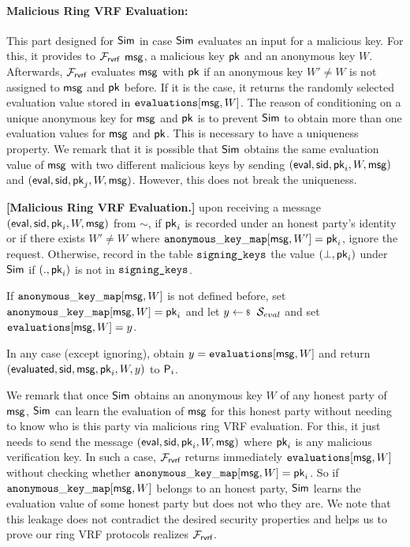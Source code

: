 \paragraph{Malicious Ring VRF Evaluation:} This part  designed for $ \mathsf{Sim} $ in case $ \mathsf{Sim} $  evaluates an input for a malicious key. For this,  it  provides to $ \mathcal{F}_{\textsf{rvrf}} $  $ \mathsf{msg} $, a malicious key $ \mathsf{pk} $ and an anonymous key $ W $.  Afterwards, $ \mathcal{F}_{\textsf{rvrf}} $ evaluates  $ \mathsf{msg} $ with $ \mathsf{pk} $ if an anonymous key $ W' \neq W$  is not assigned to $ \mathsf{msg} $ and $ \mathsf{pk} $ before.  If it is the case, it returns the randomly selected evaluation value stored  in $ \texttt{evaluations}[\mathsf{msg}, W] $. The reason of conditioning on a unique anonymous key for $ \mathsf{msg} $ and $ \mathsf{pk} $ is to prevent $ \mathsf{Sim} $ to obtain more than one evaluation values for $ \mathsf{msg} $ and $ \mathsf{pk} $. This is necessary to have a uniqueness property.
We remark that it is possible  that $ \mathsf{Sim} $ obtains the same evaluation value of $ \mathsf{msg} $ with two different malicious  keys  by sending $ (\mathsf{eval}, \textsf{sid}, \mathsf{pk}_i, W, \mathsf{msg}) $ and $(\mathsf{eval}, \textsf{sid}, \mathsf{pk}_j, W, \mathsf{msg})$. However, this does not break the uniqueness.

\begin{tcolorbox}[left=2pt,right=2pt]
	\eprint{}{\scriptsize}
	\textbf{[Malicious Ring VRF Evaluation.]}  upon receiving a message $(\mathsf{eval}, \textsf{sid}, \mathsf{pk}_i, W, \mathsf{msg})$ from $\sim$, if $ \mathsf{pk}_i $ is recorded under an honest party's identity or if there exists $ W'\neq W $ where $ \mathtt{anonymous\_key\_map}[\mathsf{msg},W'] = \mathsf{pk}_i $, ignore the request.
	Otherwise, record in the table $\texttt{signing\_keys}$ the value $(\perp,\mathsf{pk}_i)$ under $\mathsf{Sim}$ if $ (.,\mathsf{pk}_i) $ is not in $ \texttt{signing\_keys} $.
	
	If  $\mathtt{anonymous\_key\_map}[\mathsf{msg},W]  $ is not defined before, set $ \mathtt{anonymous\_key\_map}[\mathsf{msg},W] = \mathsf{pk}_i $ and let   $y \leftsample \setsym{S}_{eval}$ and set $ \texttt{evaluations}[\mathsf{msg}, W] = y$.
	
	In any case (except ignoring), obtain $ y = \texttt{evaluations}[\mathsf{msg}, W] $ and return $(\mathsf{evaluated}, \textsf{sid},  \mathsf{msg}, \mathsf{pk}_i,W, y)$ to $ \mathsf{P}_i $.
\end{tcolorbox}

We remark that once $ \mathsf{Sim} $ obtains an anonymous key $ W $ of any honest party of  $ \mathsf{msg} $,  $ \mathsf{Sim} $ can learn the  evaluation of  $ \mathsf{msg} $ for this honest party without needing to know who is this party via malicious ring VRF evaluation. For this, it just needs to send the message $ (\mathsf{eval}, \textsf{sid}, \mathsf{pk}_i,W,\mathsf{msg}) $ where $ \mathsf{pk}_i $ is any malicious verification key. In such a case, $ \mathcal{F}_{\textsf{rvrf}} $  returns immediately $ \texttt{evaluations}[\mathsf{msg}, W] $ without checking whether $ \mathtt{anonymous\_key\_map}[\mathsf{msg},W] = \mathsf{pk}_i $. So if   $ \mathtt{anonymous\_key\_map}[\mathsf{msg},W]  $ belongs to an honest party, $ \mathsf{Sim} $ learns the evaluation value of some honest party but does not who they are. We note that this leakage does not contradict the desired security properties and helps us to prove our ring VRF protocols realizes $ \mathcal{F}_{\textsf{rvrf}} $.  

